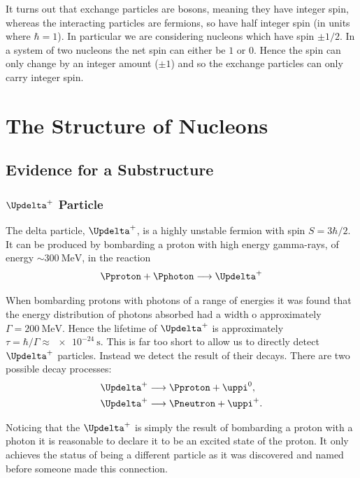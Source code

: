 \documentclass[fleqn]{NotesClass}
\makeatletter
\newcommand{\PBASE@pion}{\uppi}
\newcommand{\Ppion}{\ensuremath{\PBASE@pion}}
\newcommand{\Ppionp}{\ensuremath{\Ppion^+}}
\newcommand{\Ppionzero}{\ensuremath{\Ppion^0}}
\newcommand{\PBASE@Delta}{\Updelta}
\newcommand{\PDeltap}{\ensuremath{\PBASE@Delta^+}}
\makeatother
\begin{document}
    It turns out that exchange particles are bosons, meaning they have integer spin, whereas the interacting particles are fermions, so have half integer spin (in units where \(\hbar = 1\)).
    In particular we are considering nucleons which have spin \(\pm 1/2\).
    In a system of two nucleons the net spin can either be \(1\) or \(0\).
    Hence the spin can only change by an integer amount (\(\pm 1\)) and so the exchange particles can only carry integer spin.
    
    \chapter{The Structure of Nucleons}
    \section{Evidence for a Substructure}
    \subsection{\texorpdfstring{\PDeltap{} Particle}{Delta Plus Particle}}
    The delta particle, \(\PDeltap\), is a highly unstable fermion with spin \(S = 3\hbar/2\).
    It can be produced by bombarding a proton with high energy gamma-rays, of energy \(\sim \qty{300}{\MeV}\), in the reaction
    \begin{equation}
        \Pproton + \Pphoton \longrightarrow \PDeltap
    \end{equation}

    When bombarding protons with photons of a range of energies it was found that the energy distribution of photons absorbed had a width o approximately \(\Gamma = \qty{200}{\MeV}\).
    Hence the lifetime of \PDeltap{} is approximately \(\tau = \hbar/\Gamma \approx \qty{e-24}{\second}\).
    This is far too short to allow us to directly detect \PDeltap{} particles.
    Instead we detect the result of their decays.
    There are two possible decay processes:
    \begin{align}
        \PDeltap &\longrightarrow \Pproton + \Ppionzero,\\
        \PDeltap &\longrightarrow \Pneutron + \Ppionp.
    \end{align}
    
    Noticing that the \PDeltap{} is simply the result of bombarding a proton with a photon it is reasonable to declare it to be an excited state of the proton.
    It only achieves the status of being a different particle as it was discovered and named before someone made this connection.
    
\end{document}
